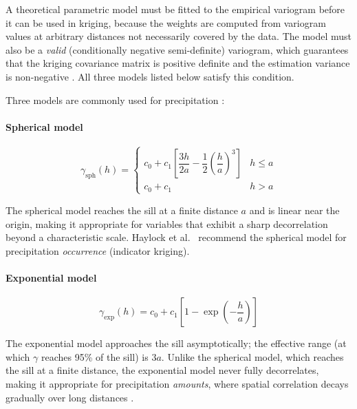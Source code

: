 A theoretical parametric model must be fitted to the empirical variogram before
it can be used in kriging, because the weights are computed from variogram
values at arbitrary distances not necessarily covered by the data.
The model must also be a \textit{valid} (conditionally negative
semi-definite) variogram, which guarantees that the kriging covariance
matrix is positive definite and the estimation variance is non-negative
\cite{cressie1993}.
All three models listed below satisfy this condition.

Three models are commonly used for precipitation
\cite[see][ch.~2--4]{cressie1993, webster2007geostatistics}:

\paragraph{Spherical model}

\begin{equation}
    \gamma_{\text{sph}}(h) =
    \begin{cases}
        c_0 + c_1 \!\left[\dfrac{3h}{2a} - \dfrac{1}{2}\!\left(\dfrac{h}{a}\right)^{\!3}\right]
        & h \le a \\[8pt]
        c_0 + c_1 & h > a
    \end{cases}
    \label{eq:spherical}
\end{equation}

The spherical model reaches the sill at a finite distance $a$ and is linear
near the origin, making it appropriate for variables that exhibit a sharp
decorrelation beyond a characteristic scale.
Haylock et al.~\cite{haylock2008european} recommend the spherical model for precipitation
\textit{occurrence} (indicator kriging).

\paragraph{Exponential model}

\begin{equation}
    \gamma_{\text{exp}}(h) = c_0 + c_1 \left[1 - \exp\!\left(-\frac{h}{a}\right)\right]
    \label{eq:exponential}
\end{equation}

The exponential model approaches the sill asymptotically; the effective range
(at which $\gamma$ reaches 95\% of the sill) is $3a$.
Unlike the spherical model, which reaches the sill at a finite distance,
the exponential model never fully decorrelates, making it appropriate for
precipitation \textit{amounts}, where spatial correlation
decays gradually over long distances \cite{haylock2008european}.

